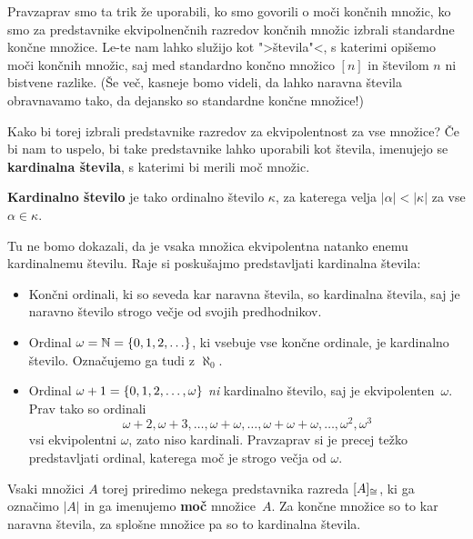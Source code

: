 Pravzaprav smo ta trik že uporabili, ko smo govorili o moči končnih množic, ko smo za predstavnike ekvipolnenčnih razredov končnih množic izbrali standardne končne množice. Le-te nam lahko služijo kot ">števila"<, s katerimi opišemo moči končnih množic, saj med standardno končno množico $[n]$ in številom $n$ ni bistvene razlike. (Še več, kasneje bomo videli, da lahko naravna števila obravnavamo tako, da dejansko so standardne končne množice!)

Kako bi torej izbrali predstavnike razredov za ekvipolentnost za vse množice?
Če bi nam to uspelo, bi take predstavnike lahko uporabili kot števila, imenujejo se \textbf{kardinalna števila}, s katerimi bi merili moč množic.

\begin{definicija}
  \textbf{Kardinalno število} je tako ordinalno število $\kappa$, za katerega velja $|\alpha| < |\kappa|$ za vse $\alpha \in \kappa$.
\end{definicija}

\begin{zgled}
  Tu ne bomo dokazali, da je vsaka množica ekvipolentna natanko enemu kardinalnemu številu. Raje si poskušajmo predstavljati kardinalna števila:
  \begin{itemize}
  \item Končni ordinali, ki so seveda kar naravna števila, so kardinalna števila, saj je naravno število strogo večje od
    svojih predhodnikov.
  \item Ordinal $\omega = \mathbb{N} = \left\{0, 1, 2, \ldots\right\}$, ki vsebuje vse končne ordinale, je kardinalno število. Označujemo ga tudi z $\aleph_0$.
  \item Ordinal $\omega + 1 = \left\{0, 1, 2, \ldots, \omega\right\}$ \emph{ni} kardinalno število, saj je ekvipolenten~$\omega$. Prav tako so ordinali
    \begin{equation*}
      \omega + 2, \omega + 3, \ldots, \omega + \omega, \ldots, \omega + \omega + \omega, \ldots, \omega^2, \omega^3
    \end{equation*}
    vsi ekvipolentni $\omega$, zato niso kardinali. Pravzaprav si je precej težko predstavljati ordinal, katerega moč je strogo večja od $\omega$.
  \end{itemize}
\end{zgled}

Vsaki množici $A$ torej priredimo nekega predstavnika razreda $[A]_{\cong}$, ki ga označimo $|A|$ in ga imenujemo \textbf{moč} množice~$A$. Za končne množice so to kar naravna števila, za splošne množice pa so to kardinalna števila.

